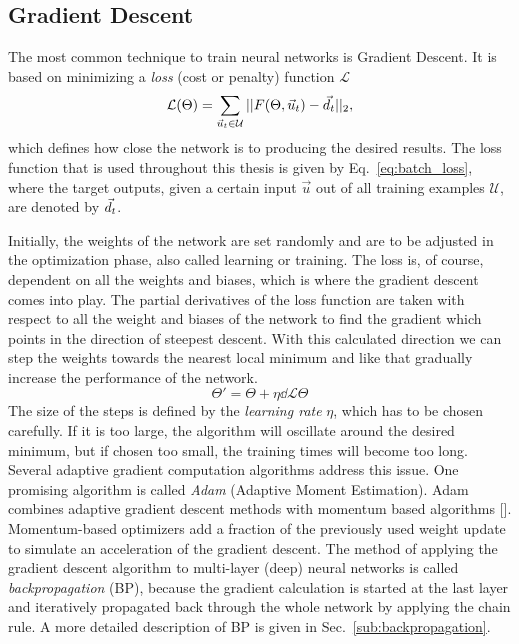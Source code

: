 \subsection{Gradient Descent}
\label{sub:gradient_descent}

The most common technique to train neural networks is Gradient Descent.
It is based on minimizing a \emph{loss} (cost or penalty) function $\mathcal{L}$
\begin{equation}
  \label{eq:batch_loss}
  \mathcal{L}(\Theta) = \sum_{\vec{u}_t \in \mathcal{U}} 
                        ||F(\Theta, \vec{u}_t) - \vec{d}_t||_2,
\end{equation}
which defines how close the network is to producing the
desired results.  The loss function that is used throughout this thesis is
given by Eq.~\ref{eq:batch_loss}, where the target outputs, given a certain
input $\vec{u}$ out of all training examples $\mathcal{U}$, are denoted by
$\vec{d}_t$.  

Initially, the weights of the network are set randomly and are to be adjusted
in the optimization phase, also called learning or training.  The loss is, of
course, dependent on all the weights and biases, which is where the gradient
descent comes into play.  The partial derivatives of the loss function are
taken with respect to all the weight and biases of the network to find the
gradient which points in the direction of steepest descent.  With this
calculated direction we can step the weights towards the nearest local minimum
and like that gradually increase the performance of the network.
\begin{equation}
  \label{eq:gradient_descent}
  \Theta' = \Theta + \eta \dd{\mathcal{L}}{\Theta}
\end{equation}
The size of the steps is defined by the \emph{learning rate} $\eta$, which has
to be chosen carefully.  If it is too large, the algorithm will oscillate
around the desired minimum, but if chosen too small, the training times will
become too long.  Several adaptive gradient computation algorithms address this
issue. One promising algorithm is called \emph{Adam} (Adaptive Moment
Estimation). Adam combines adaptive gradient descent methods with
momentum based algorithms [\cite{ADAM}]. Momentum-based optimizers add a fraction
of the previously used weight update to simulate an acceleration of the
gradient descent.  The method of applying the gradient descent algorithm to
multi-layer (deep) neural networks is called \emph{backpropagation} (BP),
because the gradient calculation is started at the last layer and iteratively
propagated back through the whole network by applying the chain rule. A more
detailed description of BP is given in Sec.~\ref{sub:backpropagation}.

